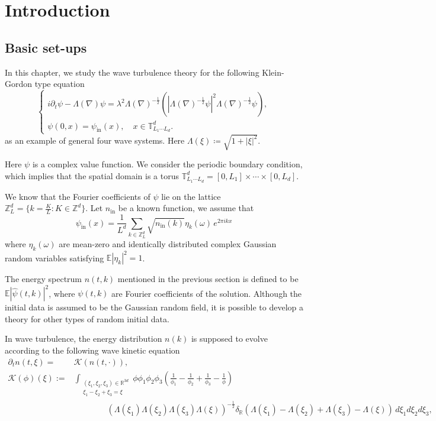 \section{Introduction}


\subsection{Basic set-ups}

In this chapter, we study the wave turbulence theory for the following Klein-Gordon type equation
\begin{equation}\tag{NKLG}\label{eq.NKLG.fourwave}
 \begin{cases}
 i\partial_t\psi-\Lambda(\nabla)\psi=\lambda^2 \Lambda(\nabla)^{-\frac{1}{2}}\left(|\Lambda(\nabla)^{-\frac{1}{2}}\psi|^2\Lambda(\nabla)^{-\frac{1}{2}}\psi\right),\\[.6em]
 \psi(0,x) = \psi_{\textrm{in}}(x), \quad x\in \mathbb{T}^d_{L_1\cdots L_d}.
 \end{cases} 
\end{equation}
as an example of general four wave systems. Here $\Lambda(\xi)\coloneqq\sqrt{1+|\xi|^2}$.

Here $\psi$ is a complex value function. We consider the periodic boundary condition, which implies that the spatial domain is a torus $\mathbb{T}^d_{L_1\cdots L_d}=[0, L_1]\times\cdots\times[0, L_d]$. 

We know that the Fourier coefficients of $\psi$ lie on the lattice $\mathbb{Z}_L^d = \{k=\frac{K}{L}:K\in \mathbb{Z}^d\}$. Let $n_{\textrm{in}}$ be a known function, we assume that
\begin{equation}\label{eq.wellprepared.fourwave}
\psi_{\textrm{in}}(x)=\frac{1}{L^d}\sum_{k\in\mathbb{Z}^d_L}\sqrt{n_{\textrm{in}}(k)} \eta_k(\omega)\, e^{2\pi i kx}
\end{equation}
where $\eta_k(\omega)$ are mean-zero and identically distributed complex Gaussian random variables satisfying $\mathbb E |\eta_k|^2=1$. 

The energy spectrum $n(t,k)$ mentioned in the previous section is defined to be $\mathbb E |\widehat \psi(t, k)|^2$, where $\psi(t, k)$ are Fourier coefficients of the solution. Although the initial data is assumed to be the Gaussian random field, it is possible to develop a theory for other types of random initial data.

In wave turbulence, the energy distribution $n(k)$ is supposed to evolve according to the following wave kinetic equation
\[
\tag{WKE}\label{eq.WKE_KG.fourwave}
\begin{split}
\partial_t n(t, \xi) =&\mathcal K\left(n(t, \cdot)\right), \\
\mathcal K(\phi)(\xi):=& \int_{\substack{(\xi_1, \xi_2, \xi_3)\in \mathbb{R}^{3d}\\\xi_1-\xi_2+\xi_3=\xi}} \phi \phi_1 \phi_2 \phi_3\left(\frac{1}{\phi_1}-\frac{1}{\phi_2}+\frac{1}{\phi_3}-\frac{1}{\phi}\right)
\\
&\qquad\qquad(\Lambda(\xi_1)\Lambda(\xi_2)\Lambda(\xi_3)\Lambda(\xi))^{-\frac{1}{2}}\delta_{\mathbb{R}}(\Lambda(\xi_1)-\Lambda(\xi_2)+\Lambda(\xi_3)-\Lambda(\xi))\, d\xi_1 d\xi_2 d\xi_3,
\end{split}
\]


